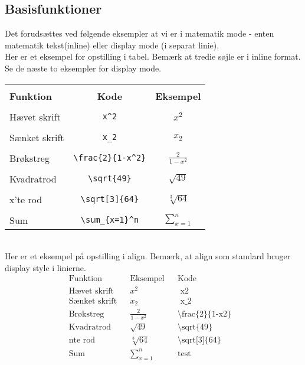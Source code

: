 \documentclass{article}
\begin{document}
\subsection{Basisfunktioner}
Det forudsættes ved følgende eksempler at vi er i matematik mode - enten matematik tekst(inline) eller display mode (i separat linie).\\
Her er et eksempel for opstilling i tabel. Bemærk at tredie søjle er i inline format. 
Se de næste to eksempler for display mode.\\
\begin{tabular}{l c c}
{}\\
\textbf{Funktion}&\textbf{Kode}&\textbf{Eksempel}\\\\
Hævet skrift&\verb"x^2"& \(x^2\)  \\\\
Sænket skrift&\verb"x_2"&\(x_2\)  \\\\
Brøkstreg&\verb"\frac{2}{1-x^2}"&\(\frac{2}{1-x^2}\)\\\\
Kvadratrod&\verb"\sqrt{49}"&\(\sqrt{49}\) \\\\
x'te rod&\verb"\sqrt[3]{64}"&\(\sqrt[3]{64}\) \\\\
Sum	&\verb"\sum_{x=1}^n"	&\(\sum_{x=1}^n\)\\
\end{tabular}\\
Her er et eksempel på opstilling i align. Bemærk, at align som standard bruger display style i linierne.
\begin{align*}
&\text{Funktion} &&	\text{Eksempel} &&	\text{Kode}&&\\
&\text{Hævet skrift} &&	x^2 &&	\text{ x\^{}2}&&\\
&\text{Sænket skrift} &&	x_2 &&		\text{ x\_{}2}&&\\
&\text{Brøkstreg} &&	\frac {2}{1-x^2} &&	\text{\textbackslash frac\{2\}\{1-x\^{}2\}}&&\\
&\text{Kvadratrod} &&	\sqrt{49} &&	\text{\textbackslash sqrt\{49\}}&&\\
&\text{nte rod} &&	\sqrt [3] {64} &&	\text{\textbackslash sqrt[3]\{64\}}&&\\
&\text{Sum}&& 	\sum_{x=1}^n&&	\text{test}&&\\
\text{}\\
\end{align*}
\end{document}
